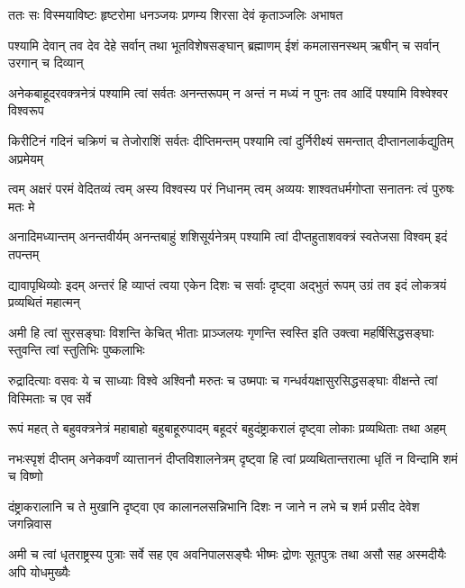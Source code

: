 \twolineshloka
{ततः सः विस्मयाविष्टः हृष्टरोमा धनञ्जयः}
{प्रणम्य शिरसा देवं कृताञ्जलिः अभाषत}%


\fourlineindentedshloka
{पश्यामि देवान् तव देव देहे}
{सर्वान् तथा भूतविशेषसङ्घान्}
{ब्रह्माणम् ईशं कमलासनस्थम्}
{ऋषीन् च सर्वान् उरगान् च दिव्यान्}%

\fourlineindentedshloka
{अनेकबाहूदरवक्त्रनेत्रं}
{पश्यामि त्वां सर्वतः अनन्तरूपम्}
{न अन्तं न मध्यं न पुनः तव आदिं}
{पश्यामि विश्वेश्वर विश्वरूप}%

\fourlineindentedshloka
{किरीटिनं गदिनं चक्रिणं च}
{तेजोराशिं सर्वतः दीप्तिमन्तम्}
{पश्यामि त्वां दुर्निरीक्ष्यं समन्तात्}
{दीप्तानलार्कद्युतिम् अप्रमेयम्}%

\fourlineindentedshloka
{त्वम् अक्षरं परमं वेदितव्यं}
{त्वम् अस्य विश्वस्य परं निधानम्}
{त्वम् अव्ययः शाश्वतधर्मगोप्ता}
{सनातनः त्वं पुरुषः मतः मे}%

\fourlineindentedshloka
{अनादिमध्यान्तम् अनन्तवीर्यम्}
{अनन्तबाहुं शशिसूर्यनेत्रम्}
{पश्यामि त्वां दीप्तहुताशवक्त्रं}
{स्वतेजसा विश्वम् इदं तपन्तम्}%

\fourlineindentedshloka
{द्यावापृथिव्योः इदम् अन्तरं हि}
{व्याप्तं त्वया एकेन दिशः च सर्वाः}
{दृष्ट्वा अद्भुतं रूपम् उग्रं तव इदं}
{लोकत्रयं प्रव्यथितं महात्मन्}%

\fourlineindentedshloka
{अमी हि त्वां सुरसङ्घाः विशन्ति}
{केचित् भीताः प्राञ्जलयः गृणन्ति}
{स्वस्ति इति उक्त्वा महर्षिसिद्धसङ्घाः}
{स्तुवन्ति त्वां स्तुतिभिः पुष्कलाभिः}%

\fourlineindentedshloka
{रुद्रादित्याः वसवः ये च साध्याः}
{विश्वे अश्विनौ मरुतः च उष्मपाः च}
{गन्धर्वयक्षासुरसिद्धसङ्घाः}
{वीक्षन्ते त्वां विस्मिताः च एव सर्वे}%

\fourlineindentedshloka
{रूपं महत् ते बहुवक्त्रनेत्रं}
{महाबाहो बहुबाहूरुपादम्}
{बहूदरं बहुदंष्ट्राकरालं}
{दृष्ट्वा लोकाः प्रव्यथिताः तथा अहम्}%

\fourlineindentedshloka
{नभःस्पृशं दीप्तम् अनेकवर्णं}
{व्यात्ताननं दीप्तविशालनेत्रम्}
{दृष्ट्वा हि त्वां प्रव्यथितान्तरात्मा}
{धृतिं न विन्दामि शमं च विष्णो}%

\fourlineindentedshloka
{दंष्ट्राकरालानि च ते मुखानि}
{दृष्ट्वा एव कालानलसन्निभानि}
{दिशः न जाने न लभे च शर्म}
{प्रसीद देवेश जगन्निवास}%

\fourlineindentedshloka
{अमी च त्वां धृतराष्ट्रस्य पुत्राः}
{सर्वे सह एव अवनिपालसङ्घैः}
{भीष्मः द्रोणः सूतपुत्रः तथा असौ}
{सह अस्मदीयैः अपि योधमुख्यैः}%

